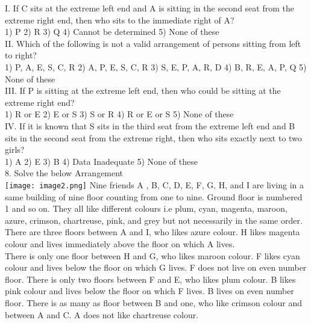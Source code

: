 \documentclass[
]{article}
\begin{document}
I. If C sits at the extreme left end and A is sitting in the second seat from the extreme right
end, then who sits to the immediate right of A?\\
1) P \hspace{2mm}2) R \hspace{2mm}3) Q
\hspace{2mm}4) Cannot be determined \hspace{2mm}5) None of these\\

II. Which of the following is not a valid arrangement of persons sitting from left to right?\\
1) P, A, E, S, C, R \hspace{2mm}2) A, P, E, S, C, R \hspace{2mm}3) S, E, P, A, R, D
\hspace{2mm}4) B, R, E, A, P, Q \hspace{2mm}5) None of these\\

III. If P is sitting at the extreme left end, then who could be sitting at the extreme right end?\\
1) R or E \hspace{2mm}2) E or S \hspace{2mm}3) S or R
\hspace{2mm}4) R or E or S \hspace{2mm}5) None of these\\

IV. If it is known that S sits in the third seat from the extreme left end and B sits in the
second seat from the extreme right, then who sits exactly next to two girls?\\
1) A \hspace{2mm}2) E \hspace{2mm}3) B
\hspace{2mm}4) Data Inadequate \hspace{2mm}5) None of these\\

8. Solve the below Arrangement\\
\texttt{[image: image2.png]}
Nine friends A , B, C, D, E, F, G, H, and I are living in a same building of nine floor counting
from one to nine. Ground floor is numbered 1 and so on. They all like different colours i.e
plum, cyan, magenta, maroon, azure, crimson, chartreuse, pink, and grey but not
necessarily in the same order. There are three floors between A and I, who likes azure
colour. H likes magenta colour and lives immediately above the floor on which A lives.\\
There is only one floor between H and G, who likes maroon colour. F likes cyan colour and
lives below the floor on which G lives. F does not live on even number floor. There is only
two floors between F and E, who likes plum colour. B likes pink colour and lives below the
floor on which F lives. B lives on even number floor. There is as many as floor between B
and one, who like crimson colour and between A and C. A does not like chartreuse colour.\\
\end{document}

